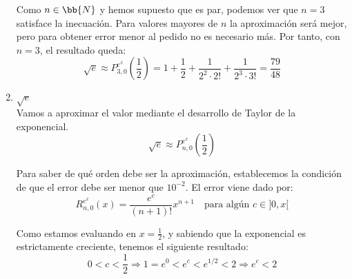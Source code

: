 \begin{ejercicio}
\begin{enumerate}
\begin{comment}
        Como nos piden que el error sea menor a $10^{-2}$, la inecuación a resolver es:
        \begin{equation*}
            R_{n,0}^{f}\left(\frac{1}{2}\right) = \frac{ f^{n+1)}(c)}{(n+1)!}{\frac{1}{2^{n+1}}} < 10^{-2}
        \end{equation*}
        Usando la condición de que $f^{n+1)}(c) < n!\left( -\frac{1}{(1.5)^{n+1}} + \frac{1}{(0.5)^{n+1}}\right)$ para $n$ impar, tenemos que:
        \begin{equation*}
            R_{n,0}^{\ln (x+1)}\left(\frac{1}{2}\right) = \frac{n!\left( \frac{1}{(1.5)^{n+1}} + \frac{1}{(0.5)^{n+1}}\right)}{(n+1)!} \frac{1}{2^{n+1}}
            = \frac{\frac{1}{(1.5)^{n+1}} + \frac{1}{(0.5)^{n+1}}}{2^{n+1}(n+1)} < 10^{-2}
        \end{equation*}
        Por tanto, resuelvo la siguiente inecuación para hallar el valor de $n$, sabiendo que $n$ es par:
        \begin{equation*}
            \frac{\frac{1}{(1.5)^{n+1}} + \frac{1}{(0.5)^{n+1}}}{2^{n+1}(n+1)} < 10^{-2}
            \Longleftrightarrow
            \frac{2^{n+1}(n+1)}{\frac{1}{(1.5)^{n+1}} + \frac{1}{(0.5)^{n+1}}} > 100
        \end{equation*}
        \end{comment}

        Como $n\in \bb{N}$ y hemos supuesto que es par, podemos ver que $n=3$ satisface la inecuación. Para valores mayores de $n$ la aproximación será mejor, pero para obtener error menor al pedido no es necesario más. Por tanto, con $n=3$, el resultado queda:
        $$\sqrt{e}\approx P_{3, 0}^{e^x}\left(\frac{1}{2}\right) = 1 + \frac{1}{2} + \frac{1}{2^2 \cdot 2!} + \frac{1}{2^3 \cdot 3!} = \frac{79}{48}$$
        
        \item $\sqrt{e}$\\
        Vamos a aproximar el valor mediante el desarrollo de Taylor de la exponencial.
        $$\sqrt{e}\approx P_{n, 0}^{e^x}\left(\frac{1}{2}\right)$$

        Para saber de qué orden debe ser la aproximación, establecemos la condición de que el error debe ser menor que $10^{-2}$. El error viene dado por:
        \begin{equation*}
            R_{n,0}^{e^x}\left(x\right) = \frac{e^c}{(n+1)!}x^{n+1} \quad \text{para algún } c\in ]0, x[
        \end{equation*}

        Como estamos evaluando en $x=\frac{1}{2}$, y sabiendo que la exponencial es estrictamente creciente, tenemos el siguiente resultado:
        \begin{equation*}
            0 < c < \frac{1}{2} \Longrightarrow 1 = e^0 < e^c < e^{1/2} < 2  \Longrightarrow e^c < 2
        \end{equation*}


\end{enumerate}
\end{ejercicio}
